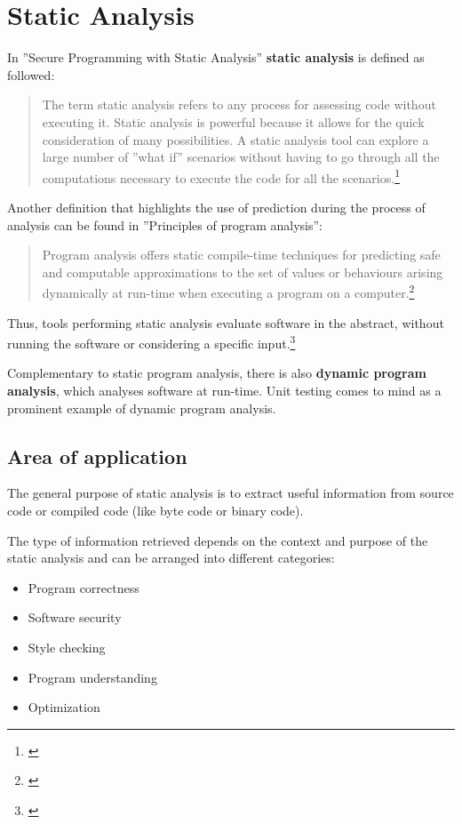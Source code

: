 \chapter{Static Analysis}

In ''Secure Programming with Static Analysis'' \textbf{static analysis} is defined as followed:

\begin{quotation}
The term static analysis refers to any process for assessing code without
executing it. Static analysis is powerful because it allows for the quick consideration of many possibilities. A static analysis tool can explore a large number of ''what if'' scenarios without having to go through all the computations
necessary to execute the code for all the scenarios.\footnote{\citep[3]{SecureProgramming}}
\end{quotation}

Another definition that highlights the use of prediction during the process of analysis can be found in ''Principles of program analysis'':

\begin{quotation}
Program analysis offers static compile-time techniques for predicting safe and computable approximations to the set of values or behaviours arising dynamically at run-time when executing a program on a computer.\footnote{\citep[1]{ProgramAnalysis}}
\end{quotation}

Thus, tools performing static analysis evaluate software in the abstract, without running the software or considering a specific input.\footnote{\citep[1]{UsingSAToFindBugs}}

Complementary to static program analysis, there is also \textbf{dynamic program analysis}, which analyses software at run-time. Unit testing comes to mind as a prominent example of dynamic program analysis.

\section{Area of application}

The general purpose of static analysis is to extract useful information from source code or compiled code (like byte code or binary code).

The type of information retrieved depends on the context and purpose of the static analysis and can be arranged into different categories:

\begin{itemize}\addtolength{\itemsep}{-0.5\baselineskip}
\item Program correctness
\item Software security
\item Style checking
\item Program understanding
\item Optimization
\end{itemize}

